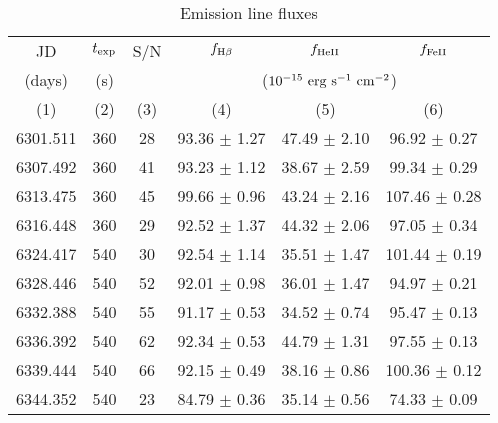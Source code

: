 \documentclass[iop]{emulateapj}
\begin{document}
\begin{table}
	\centering
	\caption{Emission line fluxes}
	\begin{tabular}{cccccc}
		\tableline\tableline
		JD & $t_{\rm exp}$ & S/N & $f_{\rm H\beta}$  &  $f_{\rm He {\small II}}$ & $f_{\rm Fe {\small II}}$  \\
		(days) & (s) &  & \multicolumn{3}{c}{ ($\rm 10^{-15}~erg~s^{-1}~cm^{-2}$) } \\
		(1) & (2) & (3) & (4) & (5) & (6) \\
		\tableline
  6301.511  &  360  &  28 &  93.36  $\pm$    1.27  &   47.49  $\pm$    2.10  &   96.92  $\pm$    0.27   \\
  6307.492  &  360  &  41 &  93.23  $\pm$    1.12  &   38.67  $\pm$    2.59  &   99.34  $\pm$    0.29   \\
  6313.475  &  360  &  45 &  99.66  $\pm$    0.96  &   43.24  $\pm$    2.16  &  107.46  $\pm$    0.28   \\
  6316.448  &  360  &  29 &  92.52  $\pm$    1.37  &   44.32  $\pm$    2.06  &   97.05  $\pm$    0.34   \\
  6324.417  &  540  &  30 &  92.54  $\pm$    1.14  &   35.51  $\pm$    1.47  &  101.44  $\pm$    0.19   \\
  6328.446  &  540  &  52 &  92.01  $\pm$    0.98  &   36.01  $\pm$    1.47  &   94.97  $\pm$    0.21   \\
  6332.388  &  540  &  55 &  91.17  $\pm$    0.53  &   34.52  $\pm$    0.74  &   95.47  $\pm$    0.13   \\
  6336.392  &  540  &  62 &  92.34  $\pm$    0.53  &   44.79  $\pm$    1.31  &   97.55  $\pm$    0.13   \\
  6339.444  &  540  &  66 &  92.15  $\pm$    0.49  &   38.16  $\pm$    0.86  &  100.36  $\pm$    0.12   \\
  6344.352  &  540  &  23 &  84.79  $\pm$    0.36  &   35.14  $\pm$    0.56  &   74.33  $\pm$    0.09   \\

\end{tabular}
\end{table}
\end{document}

